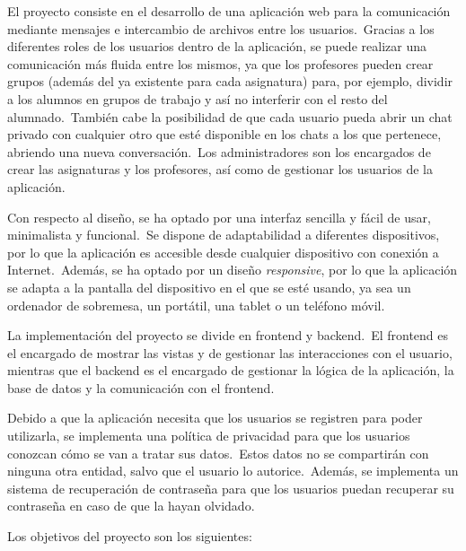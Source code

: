 

El proyecto consiste en el desarrollo de una aplicación web para la comunicación mediante mensajes e intercambio de
archivos entre los usuarios.\ Gracias a los diferentes roles de los usuarios dentro de la aplicación, se puede
realizar una comunicación más fluida entre los mismos, ya que los profesores pueden crear grupos (además del ya
existente para cada asignatura) para, por ejemplo, dividir a los alumnos en grupos de trabajo y así no interferir con
el resto del alumnado.\ También cabe la posibilidad de que cada usuario pueda abrir un chat privado con cualquier
otro que esté disponible en los chats a los que pertenece, abriendo una nueva conversación.\ Los administradores son
los encargados de crear las asignaturas y los profesores, así como de gestionar los usuarios de la aplicación.

Con respecto al diseño, se ha optado por una interfaz sencilla y fácil de usar, minimalista y funcional.\ Se dispone
de adaptabilidad a diferentes dispositivos, por lo que la aplicación es accesible desde cualquier dispositivo con
conexión a Internet.\ Además, se ha optado por un diseño \textit{responsive}, por lo que la aplicación se adapta a la
pantalla del dispositivo en el que se esté usando, ya sea un ordenador de sobremesa, un portátil, una tablet o un
teléfono móvil.

La implementación del proyecto se divide en frontend y backend.\ El frontend es el encargado de mostrar las vistas
y de gestionar las interacciones con el usuario, mientras que el backend es el encargado de gestionar la lógica de
la aplicación, la base de datos y la comunicación con el frontend.

Debido a que la aplicación necesita que los usuarios se registren para poder utilizarla, se implementa una política de
privacidad para que los usuarios conozcan cómo se van a tratar sus datos.\ Estos datos no se compartirán con
ninguna otra entidad, salvo que el usuario lo autorice.\ Además, se implementa un sistema de
recuperación de contraseña para que los usuarios puedan recuperar su contraseña en caso de que la hayan olvidado.


Los objetivos del proyecto son los siguientes:

